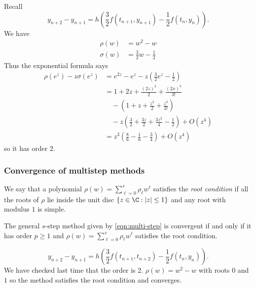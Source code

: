 \documentclass[a4paper]{article}
\begin{document}
\begin{eg}
  Recall
  \[
    y_{n + 2} - y_{n + 1} = h \left( \frac{3}{2}f(t_{n + 1}, y_{n + 1}) - \frac{1}{2}f(t_n, y_n) \right).
  \]
  We have
  \begin{align*}
    \rho(w) &= w^2 - w \\
    \sigma(w) &= \frac{3}{2}w - \frac{1}{2}
  \end{align*}
  Thus the exponential formula says
  \begin{align*}
    \rho(e^z) -z\sigma(e^z)
    &= e^{2z} - e^z - z (\frac{3}{2}e^z - \frac{1}{2}) \\
    &= 1 + 2z + \frac{(2z)^2}{2} + \frac{(2x)^3}{3!} \\
    &\quad - (1 + z + \frac{z^2}{2} + \frac{z^3}{3!}) \\
    &\quad -z(\frac{3}{2} + \frac{3z}{2} + \frac{3z^2}{4} - \frac{1}{2}) + O(z^4) \\
    &= z^3(\frac{8}{6} - \frac{1}{6} - \frac{3}{4}) + O(z^4)
  \end{align*}
  so it has order \(2\).
\end{eg}

\subsubsection{Convergence of multistep methods}

\begin{definition}
  We say that a polynomial \(\rho(w) = \sum_{\ell = 0}^s \rho_\ell w^\ell\) satisfies the \emph{root condition} if all the roots of \(\rho\) lie inside the unit disc \(\{z \in \C: |z| \leq 1\}\) and any root with modulus \(1\) is simple.
\end{definition}

\begin{theorem}
  The general \(s\)-step method given by \eqref{eqn:multi-step} is convergent if and only if it has order \(p \geq 1\) and \(\rho(w) = \sum_{\ell = 0}^s \rho_\ell w^\ell\) satisfies the root condition.
\end{theorem}

\begin{eg}
  \[
    y_{n + 2} - y_{n + 1} = h \left( \frac{3}{2} f(t_{n + 1}, t_{n + 2}) - \frac{1}{2}f(t_n, y_n) \right).
  \]
  We have checked last time that the order is 2. \(\rho(w) = w^2 - w\) with roots \(0\) and \(1\) so the method satisfies the root condition and converges.
\end{eg}
\end{document}
